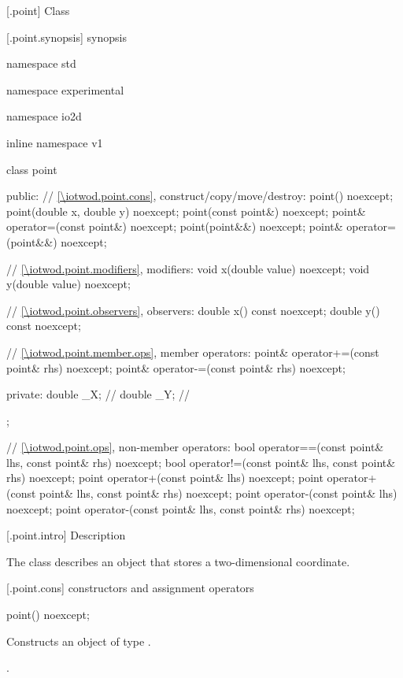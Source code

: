  [\iotwod.point] {Class }

 [\iotwod.point.synopsis] { synopsis}

\begin{codeblock}
namespace std { namespace experimental { namespace io2d { inline namespace v1 {
  class point {
  public:
    // \ref{\iotwod.point.cons}, construct/copy/move/destroy:
    point() noexcept;
    point(double x, double y) noexcept;
    point(const point&) noexcept;
    point& operator=(const point&) noexcept;
    point(point&&) noexcept;
    point& operator=(point&&) noexcept;

    // \ref{\iotwod.point.modifiers}, modifiers:
    void x(double value) noexcept;
    void y(double value) noexcept;
    
    // \ref{\iotwod.point.observers}, observers:
    double x() const noexcept;
    double y() const noexcept;
    
    // \ref{\iotwod.point.member.ops}, member operators:
    point& operator+=(const point& rhs) noexcept;
    point& operator-=(const point& rhs) noexcept;
    
  private:
    double _X; // \expos
    double _Y; // \expos
  };
  
  // \ref{\iotwod.point.ops}, non-member operators:
  bool operator==(const point& lhs, const point& rhs) noexcept;
  bool operator!=(const point& lhs, const point& rhs) noexcept;
  point operator+(const point& lhs) noexcept;
  point operator+(const point& lhs, const point& rhs) noexcept;
  point operator-(const point& lhs) noexcept;
  point operator-(const point& lhs, const point& rhs) noexcept;
} } } }
\end{codeblock}

 [\iotwod.point.intro] { Description}

\pnum
{}%
The class  describes an object that stores a two-dimensional coordinate.

 [\iotwod.point.cons] { constructors and assignment operators}

\begin{itemdecl}
point() noexcept;
\end{itemdecl}
\begin{itemdescr}
	\pnum
	\effects
	Constructs an object of type .
	
	\pnum
	\postconditions
	.
\end{itemdescr}

